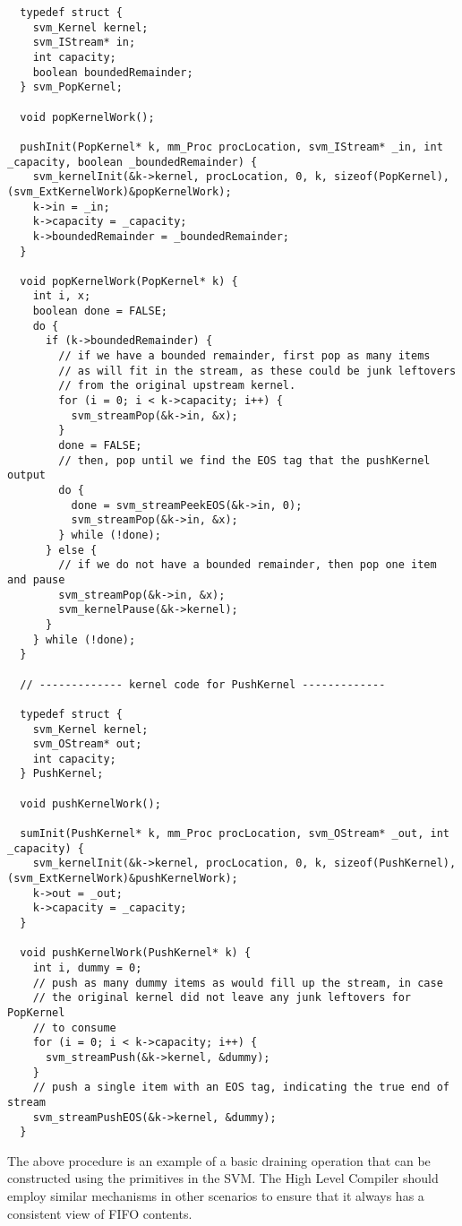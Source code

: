 {\begin{verbatim}
  typedef struct {
    svm_Kernel kernel;
    svm_IStream* in;
    int capacity;
    boolean boundedRemainder;
  } svm_PopKernel;

  void popKernelWork();
  
  pushInit(PopKernel* k, mm_Proc procLocation, svm_IStream* _in, int _capacity, boolean _boundedRemainder) {
    svm_kernelInit(&k->kernel, procLocation, 0, k, sizeof(PopKernel), (svm_ExtKernelWork)&popKernelWork); 
    k->in = _in;
    k->capacity = _capacity;
    k->boundedRemainder = _boundedRemainder;
  }

  void popKernelWork(PopKernel* k) {
    int i, x;
    boolean done = FALSE;
    do {
      if (k->boundedRemainder) {
        // if we have a bounded remainder, first pop as many items
        // as will fit in the stream, as these could be junk leftovers 
        // from the original upstream kernel.
        for (i = 0; i < k->capacity; i++) {
          svm_streamPop(&k->in, &x);
        }
        done = FALSE;
        // then, pop until we find the EOS tag that the pushKernel output
        do {
          done = svm_streamPeekEOS(&k->in, 0);
          svm_streamPop(&k->in, &x);
        } while (!done);
      } else {
        // if we do not have a bounded remainder, then pop one item and pause
        svm_streamPop(&k->in, &x);
        svm_kernelPause(&k->kernel);
      }
    } while (!done);
  }

  // ------------- kernel code for PushKernel -------------

  typedef struct {
    svm_Kernel kernel;
    svm_OStream* out;
    int capacity;
  } PushKernel;

  void pushKernelWork();
  
  sumInit(PushKernel* k, mm_Proc procLocation, svm_OStream* _out, int _capacity) {
    svm_kernelInit(&k->kernel, procLocation, 0, k, sizeof(PushKernel), (svm_ExtKernelWork)&pushKernelWork); 
    k->out = _out;
    k->capacity = _capacity;
  }

  void pushKernelWork(PushKernel* k) {
    int i, dummy = 0;
    // push as many dummy items as would fill up the stream, in case
    // the original kernel did not leave any junk leftovers for PopKernel 
    // to consume
    for (i = 0; i < k->capacity; i++) {
      svm_streamPush(&k->kernel, &dummy);
    }
    // push a single item with an EOS tag, indicating the true end of stream
    svm_streamPushEOS(&k->kernel, &dummy);
  }
\end{verbatim}}

The above procedure is an example of a basic draining operation that
can be constructed using the primitives in the SVM.  The High Level
Compiler should employ similar mechanisms in other scenarios to ensure
that it always has a consistent view of FIFO contents.

